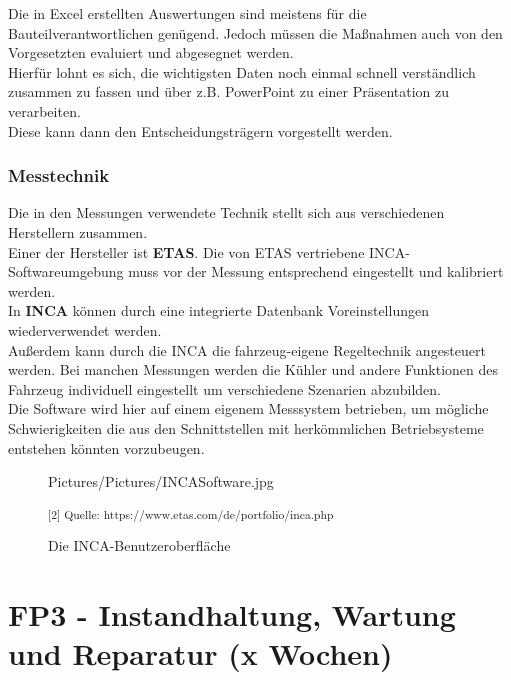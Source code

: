Die in Excel erstellten Auswertungen sind meistens für die Bauteilverantwortlichen genügend. Jedoch müssen die Maßnahmen auch von den Vorgesetzten evaluiert und abgesegnet werden.\\

Hierfür lohnt es sich, die wichtigsten Daten noch einmal schnell verständlich zusammen zu fassen und über z.B. PowerPoint zu einer Präsentation zu verarbeiten.\\
Diese kann dann den Entscheidungsträgern vorgestellt werden. 

\subsubsection{Messtechnik}

Die in den Messungen verwendete Technik stellt sich aus verschiedenen Herstellern zusammen. \\
Einer der Hersteller ist \textbf{ETAS}. Die von ETAS vertriebene INCA-Softwareumgebung muss vor der Messung entsprechend eingestellt und kalibriert werden.\\
In \textbf{INCA} können durch eine integrierte Datenbank Voreinstellungen wiederverwendet werden. \\
Außerdem kann durch die INCA die fahrzeug-eigene Regeltechnik angesteuert werden. Bei manchen Messungen werden die Kühler und andere Funktionen des Fahrzeug individuell eingestellt um verschiedene Szenarien abzubilden. \\
Die Software wird hier auf einem eigenem Messsystem betrieben, um mögliche Schwierigkeiten die aus den Schnittstellen mit herkömmlichen Betriebsysteme entstehen könnten vorzubeugen.

\begin{figure}
	\begin{center}
		\begin{overpic}[width=\linewidth]{Pictures/Pictures/INCASoftware.jpg}
			
		\end{overpic}
	\label{INCA}
	\caption{Die INCA-Benutzeroberfläche}
	\small\textsuperscript{[2] Quelle: https://www.etas.com/de/portfolio/inca.php}
	\end{center}
\end{figure}


\newpage
\section{FP3 - Instandhaltung, Wartung und Reparatur (x Wochen)}

